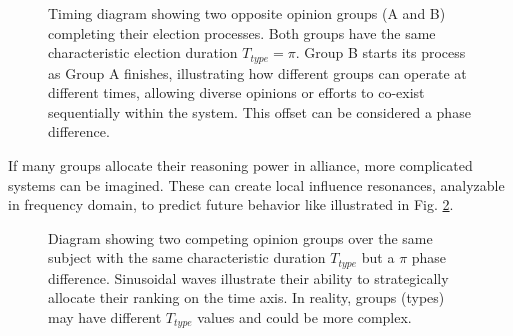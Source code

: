 \documentclass{article}
\begin{document}
\begin{CJK}{UTF8}{gbsn}
\begin{figure}[ht]
\begin{tikzpicture}[scale=1, every node/.style={scale=0.9}]
            \end{tikzpicture}
            \caption{Timing diagram showing two opposite opinion groups (A and B) completing their election processes. Both groups have the same characteristic election duration $T_{type}=\pi$. Group B starts its process as Group A finishes, illustrating how different groups can operate at different times, allowing diverse opinions or efforts to co-exist sequentially within the system. This offset can be considered a phase difference.}
            \label{fig:processes}
        \end{figure}

        If many groups allocate their reasoning power in alliance, more complicated systems can be imagined. These can create local influence resonances, analyzable in frequency domain, to predict future behavior like illustrated in Fig. \ref{fig:processes-sinusoidal}.

        \begin{figure}[ht]
            \centering
            \caption{Diagram showing two competing opinion groups over the same subject with the same characteristic duration $T_{type}$ but a $\pi$ phase difference. Sinusoidal waves illustrate their ability to strategically allocate their ranking on the time axis. In reality, groups (types) may have different $T_{type}$ values and could be more complex.
                \label{fig:processes-sinusoidal}}
        \end{figure}


\end{CJK}
\end{document}
